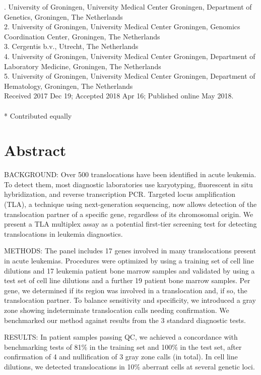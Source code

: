. University of Groningen, University Medical Center Groningen, Department of Genetics, Groningen, The Netherlands\\
2. University of Groningen, University Medical Center Groningen, Genomics Coordination Center, Groningen, The Netherlands\\
3. Cergentis b.v., Utrecht, The Netherlands \\
4. University of Groningen, University Medical Center Groningen, Department of Laboratory Medicine, Groningen, The Netherlands\\
5. University of Groningen, University Medical Center Groningen, Department of Hematology, Groningen, The Netherlands\\

\noindent
Received 2017 Dec 19; Accepted 2018 Apr 16; Published online May 2018.
\\~\\
* Contributed equally


\section*{Abstract}\label{abstract}
BACKGROUND: Over 500 translocations have been identified in acute leukemia.
To detect them, most diagnostic laboratories use karyotyping, fluorescent in situ hybridization, and reverse transcription PCR. 
Targeted locus amplification (TLA), a technique using next-generation sequencing, now allows detection of the translocation partner of a specific gene, regardless of its chromosomal origin. 
We present a TLA multiplex assay as a potential first-tier screening test for detecting translocations in leukemia diagnostics.

METHODS: The panel includes 17 genes involved in many translocations present in acute leukemias. 
Procedures were optimized by using a training set of cell line dilutions and 17 leukemia patient bone marrow samples and validated by using a test set of cell line dilutions and a further 19 patient bone marrow samples.
Per gene, we determined if its region was involved in a translocation and, if so, the translocation partner. 
To balance sensitivity and specificity, we introduced a gray zone showing indeterminate translocation calls needing confirmation. 
We benchmarked our method against results from the 3 standard diagnostic tests.

RESULTS: In patient samples passing QC, we achieved a concordance with benchmarking tests of 81\% in the training set and 100\% in the test set, after confirmation of 4 and nullification of 3 gray zone calls (in total).
In cell line dilutions, we detected translocations in 10\% aberrant cells at several genetic loci.

